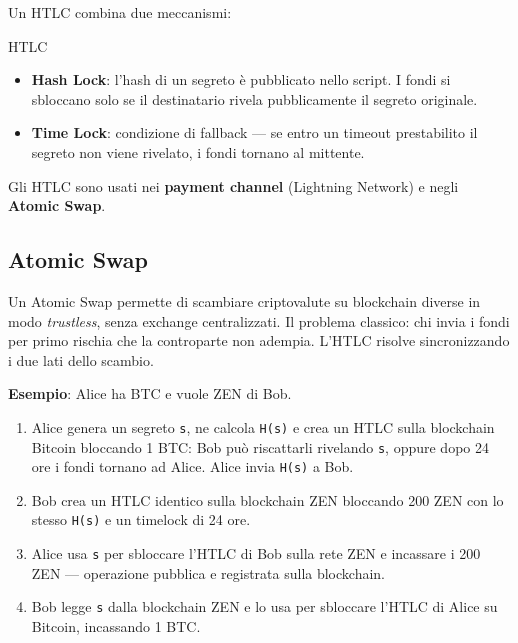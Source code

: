 \documentclass[
  italian,
  openany]{book}
\providecommand{\tightlist}{%
  \setlength{\itemsep}{0pt}\setlength{\parskip}{0pt}}
\begin{document}
Un HTLC combina due meccanismi:

\begin{calloutdefinition}{HTLC}

\begin{itemize}
\tightlist
\item
  \textbf{Hash Lock}: l'hash di un segreto è pubblicato nello script. I
  fondi si sbloccano solo se il destinatario rivela pubblicamente il
  segreto originale.
\item
  \textbf{Time Lock}: condizione di fallback --- se entro un timeout
  prestabilito il segreto non viene rivelato, i fondi tornano al
  mittente.
\end{itemize}

\end{calloutdefinition}

Gli HTLC sono usati nei \textbf{payment channel} (Lightning Network) e
negli \textbf{Atomic Swap}.

\subsection{Atomic Swap}\label{atomic-swap}

Un Atomic Swap permette di scambiare criptovalute su blockchain diverse
in modo \emph{trustless}, senza exchange centralizzati. Il problema
classico: chi invia i fondi per primo rischia che la controparte non
adempia. L'HTLC risolve sincronizzando i due lati dello scambio.

\textbf{Esempio}: Alice ha BTC e vuole ZEN di Bob.

\begin{enumerate}
\def\labelenumi{\arabic{enumi}.}
\tightlist
\item
  Alice genera un segreto \texttt{s}, ne calcola \texttt{H(s)} e crea un
  HTLC sulla blockchain Bitcoin bloccando 1 BTC: Bob può riscattarli
  rivelando \texttt{s}, oppure dopo 24 ore i fondi tornano ad Alice.
  Alice invia \texttt{H(s)} a Bob.
\item
  Bob crea un HTLC identico sulla blockchain ZEN bloccando 200 ZEN con
  lo stesso \texttt{H(s)} e un timelock di 24 ore.
\item
  Alice usa \texttt{s} per sbloccare l'HTLC di Bob sulla rete ZEN e
  incassare i 200 ZEN --- operazione pubblica e registrata sulla
  blockchain.
\item
  Bob legge \texttt{s} dalla blockchain ZEN e lo usa per sbloccare
  l'HTLC di Alice su Bitcoin, incassando 1 BTC.
\end{enumerate}
\end{document}

